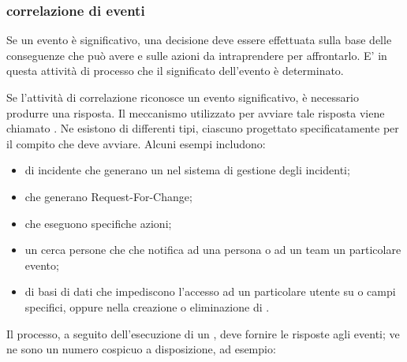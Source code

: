 \subsubsection[Correlazione di eventi]{correlazione di eventi}
Se un evento è significativo, una decisione deve essere effettuata sulla base delle conseguenze che può avere e sulle azioni da intraprendere per affrontarlo. E' in questa attività di processo che il significato dell'evento è determinato.

Se l'attività di correlazione riconosce un evento significativo, è necessario produrre una risposta. Il meccanismo utilizzato per avviare tale risposta viene chiamato . Ne esistono di differenti tipi, ciascuno progettato specificatamente per il compito che deve avviare. Alcuni esempi includono:

\begin{itemize}
\item{ di incidente che generano un  nel sistema di gestione degli incidenti;}
\item{ che generano \ac{Request-For-Change};}
\item{ che eseguono specifiche azioni;}
\item{un cerca persone che che notifica ad una persona o ad un team un particolare evento;}
\item{ di basi di dati che impediscono l'accesso ad un particolare utente su  o campi specifici, oppure nella creazione o eliminazione di .}
\end{itemize}

Il processo, a seguito dell'esecuzione di un , deve fornire le risposte agli eventi; ve ne sono un numero cospicuo a disposizione, ad esempio:

